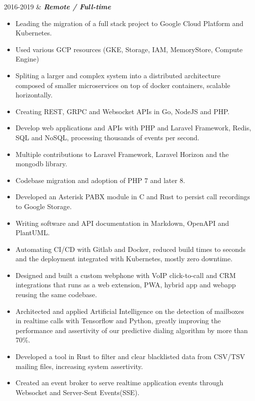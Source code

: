 \documentclass[]{cv-mauri}
\begin{document}
\begin{tabularcv}
    2016-2019   &   
		    		\textbf{\textit{Remote / Full-time}}
		    \begin{itemize}
		    	\item Leading the migration of a full stack project to Google Cloud Platform and Kubernetes.
		    	\item Used various GCP resources (GKE, Storage, IAM, MemoryStore, Compute Engine)
		    	\item Spliting a larger and complex system into a distributed architecture composed of smaller microservices on top of docker containers, scalable horizontally.
		    	\item Creating REST, GRPC and Websocket APIs in Go, NodeJS and PHP.
		    	\item Develop web applications and APIs with PHP and Laravel Framework, Redis, SQL and NoSQL, processing thousands of events per second.
		    	\item Multiple contributions to Laravel Framework, Laravel Horizon and the mongodb library.
		    	\item Codebase migration and adoption of PHP 7 and later 8.
		    	\item Developed an Asterisk PABX module in C and Rust to persist call recordings to Google Storage.
		    	\item Writing software and API documentation in Markdown, OpenAPI and PlantUML.
		    	\item Automating CI/CD with Gitlab and Docker, reduced build times to seconds and the deployment integrated with Kubernetes, mostly zero downtime.
		    	\item Designed and built a custom webphone with VoIP click-to-call and CRM integrations that runs as a web extension, PWA, hybrid app and webapp reusing the same codebase.
		    	\item Architected and applied Artificial Intelligence on the detection of mailboxes in realtime calls with Tensorflow and Python, greatly improving the performance and assertivity of our predictive dialing algorithm by more than 70\%.
		    	\item Developed a tool in Rust to filter and clear blacklisted data from CSV/TSV mailing files, increasing system assertivity.
		    	\item Created an event broker to serve realtime application events through Websocket and Server-Sent Events(SSE).
			\end{itemize}


\end{tabularcv}
\end{document}
